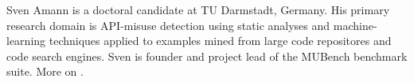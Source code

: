 \documentclass[10pt,journal,compsoc]{IEEEtran}
\begin{document}
\maketitle

\IEEEdisplaynontitleabstractindextext
%
\IEEEpeerreviewmaketitle












\balance

%



% 

\begin{IEEEbiography}{Sven Amann}
is a doctoral candidate at TU Darmstadt, Germany. His primary research domain is API-misuse
detection using static analyses and machine-learning techniques applied to examples mined from
large code repositores and code search engines. Sven is founder and project lead of the MUBench
benchmark suite. More on
.
\end{IEEEbiography}
\end{document}
